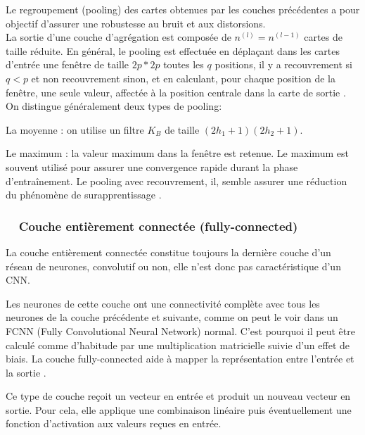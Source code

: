 Le regroupement (pooling) des cartes obtenues par les couches précédentes a pour objectif d'assurer une robustesse au bruit et aux distorsions.\\
La sortie d'une couche d'agrégation est composée de $n^{(l)} = n^{(l - 1)}$ cartes de taille réduite. En général, le pooling est effectuée en déplaçant dans les cartes d'entrée une fenêtre de taille $2p * 2p$ toutes les $q$ positions, il y a recouvrement si $q < p$ et non recouvrement sinon, et en calculant, pour chaque position de la fenêtre, une seule valeur, affectée à la position centrale dans la carte de sortie \cite{antoine2018apprentissage}. On distingue généralement deux types de pooling:

\begin{list}{--}{}
	\item La moyenne : on utilise un filtre $K_{B}$ de taille $(2h_{1} + 1)(2h_{2} + 1)$.
	\item Le maximum : la valeur maximum dans la fenêtre est retenue. Le maximum est souvent utilisé pour assurer une convergence rapide durant la phase d'entraînement. Le pooling avec recouvrement, il, semble assurer une réduction du phénomène de surapprentissage \cite{antoine2018apprentissage}.  
\end{list}




\subsubsection*{\qquad \textbullet \ \ Couche entièrement connectée (fully-connected)}

La couche entièrement connectée constitue toujours la dernière couche d'un réseau de neurones, convolutif ou non, elle n'est donc pas caractéristique d'un CNN. 

Les neurones de cette couche ont une connectivité complète avec tous les neurones de la couche précédente et suivante, comme on peut le voir dans un FCNN (Fully Convolutional Neural Network) normal. C'est pourquoi il peut être calculé comme d'habitude par une multiplication matricielle suivie d'un effet de biais. La couche fully-connected aide à mapper la représentation entre l'entrée et la sortie \cite{goodfellow2016deep}.

Ce type de couche reçoit un vecteur en entrée et produit un nouveau vecteur en sortie. Pour cela, elle applique une combinaison linéaire puis éventuellement une fonction d'activation aux valeurs reçues en entrée.

